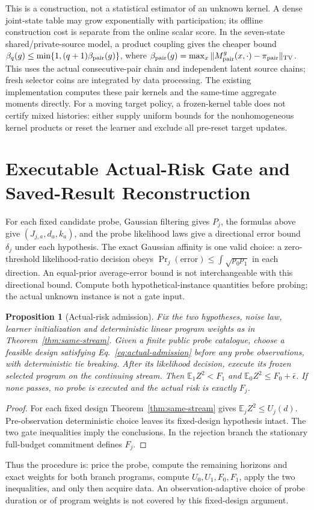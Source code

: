 \documentclass[journal]{IEEEtran}
\newcommand{\E}{\mathbb E}
\newtheorem{proposition}{Proposition}
\begin{document}
This is a construction, not a statistical estimator of an unknown kernel.
A dense joint-state table may grow exponentially with participation; its offline construction cost is separate from the online scalar score.
In the seven-state shared/private-source model, a product coupling gives the cheaper bound
$\beta_q(g)\le\min\{1,(q+1)\beta_{\rm pair}(g)\}$, where
$\beta_{\rm pair}(g)=\max_x\|M_{\rm pair}^g(x,\cdot)-\pi_{\rm pair}\|_{\rm TV}$.
This uses the actual consecutive-pair chain and independent latent source chains; fresh selector coins are integrated by data processing.
The existing implementation computes these pair kernels and the same-time aggregate moments directly.
For a moving target policy, a frozen-kernel table does not certify mixed histories: either supply uniform bounds for the nonhomogeneous kernel products or reset the learner and exclude all pre-reset target updates.

\section{Executable Actual-Risk Gate and Saved-Result Reconstruction}
For each fixed candidate probe, Gaussian filtering gives $P_j$, the formulas above give $(J_{j,a},d_a,k_a)$, and the probe likelihood laws give a directional error bound $\delta_j$ under each hypothesis.
The exact Gaussian affinity is one valid choice: a zero-threshold likelihood-ratio decision obeys $\Pr_j(\mathrm{error})\le\int\sqrt{p_0p_1}$ in each direction.
An equal-prior average-error bound is not interchangeable with this directional bound.
Compute both hypothetical-instance quantities before probing; the actual unknown instance is not a gate input.

\begin{proposition}[Actual-risk admission]
Fix the two hypotheses, noise law, learner initialization and deterministic linear program weights as in Theorem~\ref{thm:same-stream}.
Given a finite public probe catalogue, choose a feasible design satisfying Eq.~\eqref{eq:actual-admission} before any probe observations, with deterministic tie breaking.
After its likelihood decision, execute its frozen selected program on the continuing stream.
Then $\E_1Z^2<F_1$ and $\E_0Z^2\le F_0+\bar\epsilon$.
If none passes, no probe is executed and the actual risk is exactly $F_j$.
\end{proposition}
\begin{proof}
For each fixed design Theorem~\ref{thm:same-stream} gives $\E_jZ^2\le U_j(d)$.
Pre-observation deterministic choice leaves its fixed-design hypothesis intact.
The two gate inequalities imply the conclusions. In the rejection branch the stationary full-budget commitment defines $F_j$.
\end{proof}
Thus the procedure is: price the probe, compute the remaining horizons and exact weights for both branch programs, compute $U_0,U_1,F_0,F_1$, apply the two inequalities, and only then acquire data.
An observation-adaptive choice of probe duration or of program weights is not covered by this fixed-design argument.
\end{document}
